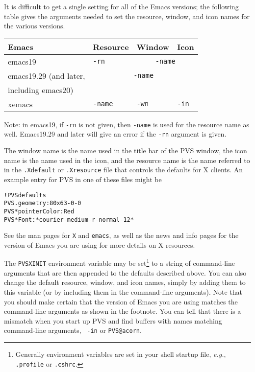 It is difficult to get a single setting for all of the Emacs versions; the
following table gives the arguments needed to set the resource, window,
and icon names for the various versions.

\begin{center}
\begin{tabular}{|l|l|l|l|} \hline
Emacs & Resource & Window & Icon \\ \hline\hline
emacs19 & \texttt{-rn} & \multicolumn{2}{|c|}{\texttt{-name}}\\ \hline
emacs19.29 (and later, & \multicolumn{3}{|c|}{\texttt{-name}}\\ 
including emacs20) & \multicolumn{3}{|c|}{ }\\ \hline
xemacs & \texttt{-name} & \texttt{-wn} & \texttt{-in} \\ \hline
\end{tabular}
\end{center}
\par\noindent Note: in emacs19, if \texttt{-rn} is not given, then
\texttt{-name} is used for the resource name as well.  Emacs19.29 and
later will give an error if the \texttt{-rn} argument is given.

The window name is the name used in the title bar of the PVS window, the
icon name is the name used in the icon, and the resource name is the name
referred to in the \texttt{.Xdefault} or \texttt{.Xresource} file that
controls the defaults for X clients.  An example entry for PVS in one of
these files might be
\begin{alltt}
!	PVS defaults
PVS.geometry: 80x63-0-0
PVS*pointerColor: Red
PVS*Font: *courier-medium-r-normal--12*
\end{alltt}
See the man pages for \texttt{X} and \texttt{emacs}, as well as the news
and info pages for the version of Emacs you are using for more details on
X resources.

The \texttt{PVSXINIT} environment variable may be set\footnote{Generally
environment variables are set in your shell startup file, \emph{e.g.},
\texttt{.profile} or \texttt{.cshrc}.} to a string
of command-line arguments that are then appended to the defaults described
above.  You can also change the default resource, window, and icon names,
simply by adding them to this variable (or by including them in the
command-line arguments).  Note that you should make certain that the
version of Emacs you are using matches the command-line arguments as shown
in the footnote.  You can tell that there is a mismatch when you start up
PVS and find buffers with names matching command-line arguments, \eg\
\texttt{-in} or \texttt{PVS@acorn}.
